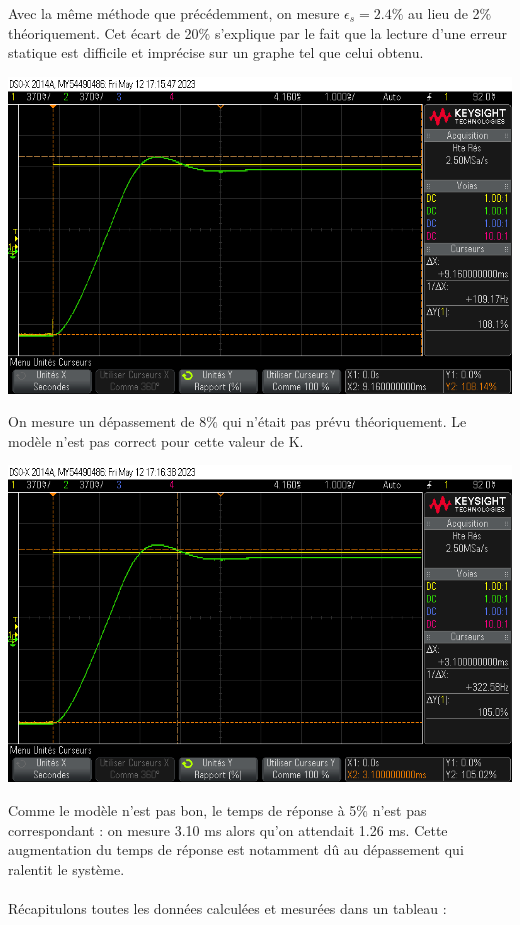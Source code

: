 \documentclass[12pt]{article}
\begin{document}
Avec la même méthode que précédemment, on mesure $\epsilon_s = 2.4\%$ au lieu de 2$\%$ théoriquement. Cet écart de 20$\%$ s'explique par le fait que la lecture d'une erreur statique est difficile et imprécise sur un graphe tel que celui obtenu.
\begin{center}
    \includegraphics[width = 16 cm]{TP3/Syst_1/P/k27_2_dep.png}
\end{center}
On mesure un dépassement de 8$\%$ qui n'était pas prévu théoriquement. Le modèle n'est pas correct pour cette valeur de K.
\begin{center}
    \includegraphics[width = 16 cm]{TP3/Syst_1/P/k27_2_tr.png}
\end{center}
Comme le modèle n'est pas bon, le temps de réponse à 5$\%$ n'est pas correspondant : on mesure 3.10 ms alors qu'on attendait 1.26 ms. Cette augmentation du temps de réponse est notamment dû au dépassement qui ralentit le système.
\\\\Récapitulons toutes les données calculées et mesurées dans un tableau : 
\end{document}
